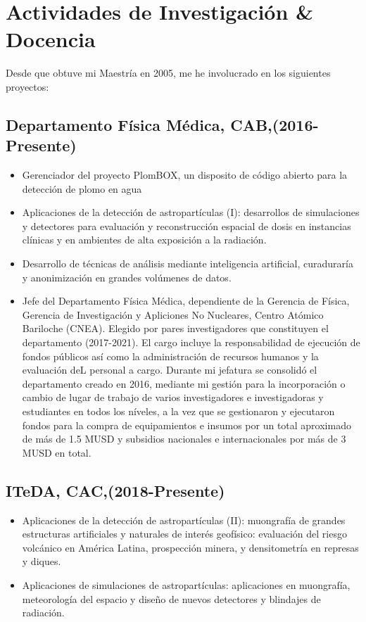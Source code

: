 \section*{Actividades de Investigación \& Docencia}

Desde que obtuve mi Maestría en 2005, me he involucrado en los siguientes proyectos:

\subsection*{Departamento Física Médica, CAB,(2016-Presente)}
\begin{itemize}
	\item Gerenciador del proyecto PlomBOX, un disposito de código abierto para la detección de plomo en agua
	\item Aplicaciones de la detección de astropartículas (I): desarrollos
		de simulaciones y detectores para evaluación y reconstrucción
		espacial de dosis en instancias clínicas y en ambientes de
		alta exposición a la radiación.
	\item Desarrollo de técnicas de análisis mediante inteligencia artificial, curaduraría y anonimización en grandes volúmenes de datos.
 	\item Jefe del Departamento Física Médica, dependiente de la
		Gerencia de Física, Gerencia de Investigación y Apliciones No
		Nucleares, Centro Atómico Bariloche (CNEA). Elegido por pares
		investigadores que constituyen el departamento (2017-2021). El cargo incluye la responsabilidad de ejecución de fondos públicos así como la administración de recursos humanos y la evaluación deL personal a cargo. Durante mi jefatura se consolidó el departamento creado en 2016, mediante mi gestión para la incorporación o cambio de lugar de trabajo de varios investigadores e investigadoras y estudiantes en todos los níveles, a la vez que se gestionaron y ejecutaron fondos para la compra de equipamientos e insumos por un total aproximado de más de 1.5 MUSD y subsidios nacionales e internacionales por más de 3 MUSD en total.

\end{itemize}

\subsection*{ITeDA, CAC,(2018-Presente)}
\begin{itemize}
	\item Aplicaciones de la detección de astropartículas (II): muongrafía de grandes estructuras artificiales y naturales de interés geofísico: evaluación del riesgo volcánico en América Latina, prospección minera, y densitometría en represas y diques.
	\item Aplicaciones de simulaciones de astropartículas: aplicaciones en muongrafía, meteorología del espacio y diseño de nuevos detectores y blindajes de radiación.
\end{itemize}

